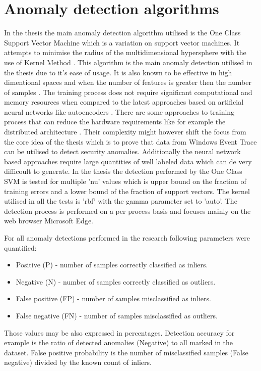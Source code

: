 \documentclass[a4paper,twoside,12pt]{book}
\begin{document}
\section{Anomaly detection algorithms}
In the thesis the main anomaly detection algorithm utilised is the One Class Support 
Vector Machine which is a variation on support vector machines. It attempts to minimise 
the radius of the multidimensional hypersphere with the use of Kernel Method \cite{bib:ocsvm}. 
This algorithm is the main anomaly detection utilised in the thesis due to it's ease of
usage. It is also known to be effective in high dimentional spaces and when 
the number of features is greater then the number of samples \cite{bib:svms}. The training process 
does not require significant computational and memory resources when compared to the latest
approaches based on artificial neural networks like autoencoders \cite{bib:autoencoder}. There are
some approaches to training process that can reduce the hardware requirements like for example the distributed architecture
\cite{bib:autoencoderDist}. Their complexity might however shift the focus from the core idea 
of the thesis which is to prove that data from Windows Event Trace can be utilised to detect security
anomalies. Additionally the neural network based approaches require large quantities of well labeled
data which can de very difficoult to generate. In the thesis the detection performed by the One Class SVM 
is tested for multiple 'nu' values which is upper bound on the fraction of training errors and a lower bound of the 
fraction of support vectors\cite{bib:skocsvm}. The kernel utilised in all the tests is 'rbf' with
the gamma parameter set to 'auto'. The detection process is performed 
on a per process basis and focuses mainly on the web browser Microsoft Edge. 

For all anomaly detections performed in the research following parameters were quantified:
\begin{itemize}
	\item Positive (P) - number of samples correctly classified as inliers.
	\item Negative (N) - number of samples correctly classified as outliers.
	\item False positive (FP) - number of samples misclassified as inliers. 
	\item False negative (FN) - number of samples misclassified as outliers.
\end{itemize}

Those values may be also expressed in percentages. Detection accuracy for example is the ratio
of detected anomalies (Negative) to all marked in the dataset. False positive probability is 
the number of misclassified samples (False negative) divided by the known count of inliers.  
\end{document}
